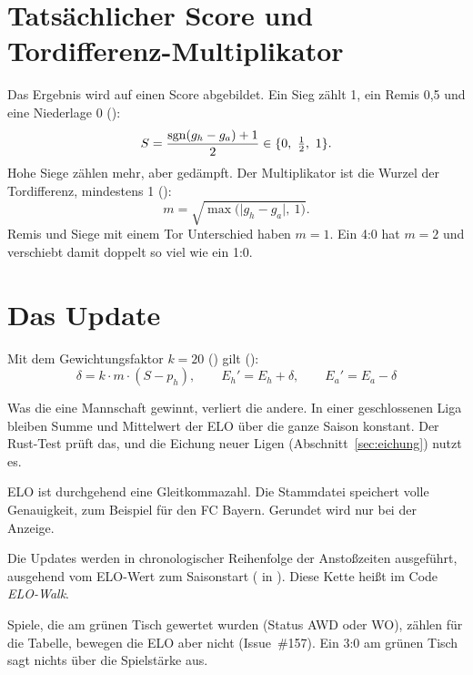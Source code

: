 \section{Tatsächlicher Score und Tordifferenz-Multiplikator}

Das Ergebnis wird auf einen Score abgebildet. Ein Sieg zählt 1, ein Remis
0{,}5 und eine Niederlage 0
():
\begin{equation}
  S = \frac{\sgn(g_h - g_a) + 1}{2} \in \{0,\ \tfrac12,\ 1\}.
\end{equation}
Hohe Siege zählen mehr, aber gedämpft. Der Multiplikator ist die Wurzel der
Tordifferenz, mindestens 1 ():
\begin{equation}
  m = \sqrt{\max\bigl(\lvert g_h - g_a\rvert,\ 1\bigr)}.
\end{equation}
Remis und Siege mit einem Tor Unterschied haben $m = 1$. Ein 4:0 hat
$m = 2$ und verschiebt damit doppelt so viel wie ein 1:0.

\section{Das Update}

Mit dem Gewichtungsfaktor $k = 20$ () gilt
():
\begin{equation}\label{eq:elo-update}
  \boxed{\;\delta = k \cdot m \cdot (S - p_h), \qquad
  E_h' = E_h + \delta, \qquad E_a' = E_a - \delta\;}
\end{equation}

\begin{description}[font=\sffamily\bfseries\small]
  \item[Nullsumme] Was die eine Mannschaft gewinnt, verliert die andere. In
        einer geschlossenen Liga bleiben Summe und Mittelwert der ELO über die
        ganze Saison konstant. Der Rust-Test
         prüft das, und die Eichung
        neuer Ligen (Abschnitt~\ref{sec:eichung}) nutzt es.
  \item[Keine Rundung] ELO ist durchgehend eine Gleitkommazahl. Die
        Stammdatei speichert volle Genauigkeit, zum Beispiel
         für den FC Bayern. Gerundet wird nur bei der
        Anzeige.
  \item[Reihenfolge] Die Updates werden in chronologischer Reihenfolge der
        Anstoßzeiten ausgeführt, ausgehend vom ELO-Wert zum Saisonstart
        ( in ). Diese
        Kette heißt im Code \emph{ELO-Walk}.
  \item[Gewertete Spiele] Spiele, die am grünen Tisch gewertet wurden
        (Status AWD oder WO), zählen für die Tabelle, bewegen die ELO aber
        nicht (Issue~\#157). Ein 3:0 am grünen Tisch sagt nichts über die
        Spielstärke aus.
\end{description}

